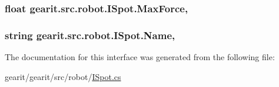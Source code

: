 \hypertarget{interfacegearit_1_1src_1_1robot_1_1_i_spot_aab90ae74fa0eaa3a82ca0a1138adfdf3}{
\subsubsection[{Max\+Force}]{\setlength{\rightskip}{0pt plus 5cm}float gearit.\+src.\+robot.\+I\+Spot.\+Max\+Force\hspace{0.3cm}{\ttfamily [get]}, {\ttfamily [set]}}}\label{interfacegearit_1_1src_1_1robot_1_1_i_spot_aab90ae74fa0eaa3a82ca0a1138adfdf3}
\hypertarget{interfacegearit_1_1src_1_1robot_1_1_i_spot_a7add3c82b363ce7d4dca5e8e09d6f3c8}{
\subsubsection[{Name}]{\setlength{\rightskip}{0pt plus 5cm}string gearit.\+src.\+robot.\+I\+Spot.\+Name\hspace{0.3cm}{\ttfamily [get]}, {\ttfamily [set]}}}\label{interfacegearit_1_1src_1_1robot_1_1_i_spot_a7add3c82b363ce7d4dca5e8e09d6f3c8}


The documentation for this interface was generated from the following file\+:\begin{DoxyCompactItemize}
\item 
gearit/gearit/src/robot/\hyperlink{_i_spot_8cs}{I\+Spot.\+cs}\end{DoxyCompactItemize}

